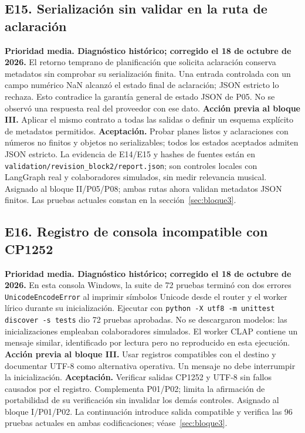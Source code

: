 \subsection{E15. Serialización sin validar en la ruta de aclaración}
\textbf{Prioridad media. Diagnóstico histórico; corregido el 18 de octubre de 2026.}
El retorno temprano de planificación que solicita aclaración conserva metadatos
sin comprobar su serialización finita. Una entrada controlada con un campo
numérico NaN alcanzó el estado final de aclaración; JSON estricto lo rechaza.
Esto contradice la garantía general de estado JSON de P05. No se observó una
respuesta real del proveedor con ese dato.
\textbf{Acción previa al bloque III.} Aplicar el mismo contrato a todas las
salidas o definir un esquema explícito de metadatos permitidos.
\textbf{Aceptación.} Probar planes listos y aclaraciones con números no finitos
y objetos no serializables; todos los estados aceptados admiten JSON estricto.
La evidencia de E14/E15 y hashes de fuentes están en
\texttt{validation/revision\_block2/report.json}; son controles locales con
LangGraph real y colaboradores simulados, sin medir relevancia musical.
Asignado al bloque II/P05/P08; ambas rutas ahora validan metadatos JSON finitos.
Las pruebas actuales constan en la sección~\ref{sec:bloque3}.

\subsection{E16. Registro de consola incompatible con CP1252}
\textbf{Prioridad media. Diagnóstico histórico; corregido el 18 de octubre de 2026.}
En esta consola Windows, la suite de 72 pruebas terminó con dos errores
\texttt{UnicodeEncodeError} al imprimir símbolos Unicode desde el router y
el worker lírico durante su inicialización. Ejecutar con
\texttt{python -X utf8 -m unittest discover -s tests} dio 72 pruebas aprobadas.
No se descargaron modelos: las inicializaciones empleaban colaboradores
simulados. El worker CLAP contiene un mensaje similar, identificado por lectura
pero no reproducido en esta ejecución.
\textbf{Acción previa al bloque III.} Usar registros compatibles con el destino
y documentar UTF-8 como alternativa operativa. Un mensaje no debe interrumpir
la inicialización. \textbf{Aceptación.} Verificar salidas CP1252 y UTF-8 sin
fallos causados por el registro. Complementa P01/P02; limita la afirmación de
portabilidad de su verificación sin invalidar los demás controles.
Asignado al bloque I/P01/P02. La continuación introduce salida compatible y
verifica las 96 pruebas actuales en ambas codificaciones; véase~\ref{sec:bloque3}.

